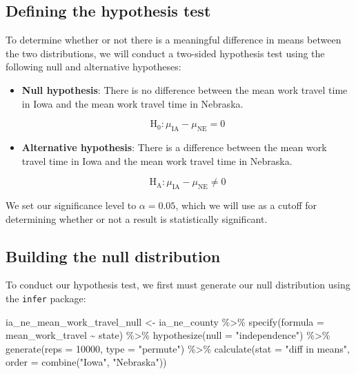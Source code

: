 \documentclass[
]{book}
\newenvironment{Shaded}{\begin{snugshade}}{\end{snugshade}}
\newcommand{\AttributeTok}[1]{\textcolor[rgb]{0.77,0.63,0.00}{#1}}
\newcommand{\DecValTok}[1]{\textcolor[rgb]{0.00,0.00,0.81}{#1}}
\newcommand{\FunctionTok}[1]{\textcolor[rgb]{0.00,0.00,0.00}{#1}}
\newcommand{\NormalTok}[1]{#1}
\newcommand{\OtherTok}[1]{\textcolor[rgb]{0.56,0.35,0.01}{#1}}
\newcommand{\SpecialCharTok}[1]{\textcolor[rgb]{0.00,0.00,0.00}{#1}}
\newcommand{\StringTok}[1]{\textcolor[rgb]{0.31,0.60,0.02}{#1}}
\begin{document}
\hypertarget{defining-the-hypothesis-test}{%
\subsection{Defining the hypothesis test}\label{defining-the-hypothesis-test}}

To determine whether or not there is a meaningful difference in means between the two distributions, we will conduct a two-sided hypothesis test using the following null and alternative hypotheses:

\begin{itemize}
\item
  \textbf{Null hypothesis}: There is no difference between the mean work travel time in Iowa and the mean work travel time in Nebraska.

  \[\text{H}_{0}:\mu_{\text{IA}}-\mu_{\text{NE}}=0\]
\item
  \textbf{Alternative hypothesis}: There is a difference between the mean work travel time in Iowa and the mean work travel time in Nebraska.

  \[\text{H}_{\text{A}}:\mu_{\text{IA}}-\mu_{\text{NE}}\neq{}0\]
\end{itemize}

We set our significance level to \(\alpha=0.05\), which we will use as a cutoff for determining whether or not a result is statistically significant.

\hypertarget{building-the-null-distribution}{%
\subsection{Building the null distribution}\label{building-the-null-distribution}}

To conduct our hypothesis test, we first must generate our null distribution using the \texttt{infer} package:

\begin{Shaded}
\begin{Highlighting}[]
\NormalTok{ia\_ne\_mean\_work\_travel\_null }\OtherTok{\textless{}{-}}\NormalTok{ ia\_ne\_county }\SpecialCharTok{\%\textgreater{}\%}
  \FunctionTok{specify}\NormalTok{(}\AttributeTok{formula =}\NormalTok{ mean\_work\_travel }\SpecialCharTok{\textasciitilde{}}\NormalTok{ state) }\SpecialCharTok{\%\textgreater{}\%}
  \FunctionTok{hypothesize}\NormalTok{(}\AttributeTok{null =} \StringTok{"independence"}\NormalTok{) }\SpecialCharTok{\%\textgreater{}\%}
  \FunctionTok{generate}\NormalTok{(}\AttributeTok{reps =} \DecValTok{10000}\NormalTok{, }\AttributeTok{type =} \StringTok{"permute"}\NormalTok{) }\SpecialCharTok{\%\textgreater{}\%}
  \FunctionTok{calculate}\NormalTok{(}\AttributeTok{stat =} \StringTok{"diff in means"}\NormalTok{, }\AttributeTok{order =} \FunctionTok{combine}\NormalTok{(}\StringTok{"Iowa"}\NormalTok{, }\StringTok{"Nebraska"}\NormalTok{))}
\end{Highlighting}
\end{Shaded}
\end{document}
